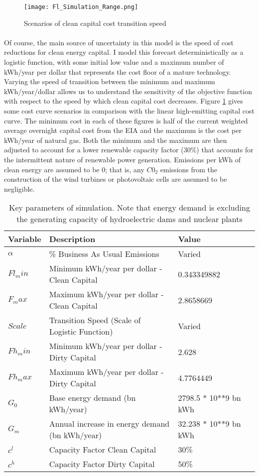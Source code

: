 \documentclass{easychithesis}
\begin{document}
\begin{figure}[h]
\texttt{[image: Fl\_Simulation\_Range.png]}
\caption{Scenarios of clean capital cost transition speed \label{fig:FlScaleScenarios}}
\end{figure}

\paragraph{} Of course, the main source of uncertainty in this model is the speed of cost reductions for clean energy capital. I model this forecast deterministically as a logistic function, with some initial low value and a maximum number of kWh/year per dollar that represents the cost floor of a mature technology. Varying the speed of transition between the minimum and maximum kWh/year/dollar allows us to understand the sensitivity of the objective function with respect to the speed by which clean capital cost decreases. Figure \ref{fig:FlScaleScenarios} gives some cost curve scenarios in comparison with the linear high-emitting capital cost curve. The minimum cost in each of these figures is half of the current weighted average overnight capital cost from the EIA and the maximum is the cost per kWh/year of natural gas. Both the minimum and the maximum are then adjusted to account for a lower renewable capacity factor (30\%) that accounts for the intermittent nature of renewable power generation. Emissions per kWh of clean energy are assumed to be 0; that is, any $C0_2$ emissions from the construction of the wind turbines or photovoltaic cells are assumed to be negligible. 


\begin{table}[h]\label{tab:ParamValues}
\begin{tabulary}{1.0\textwidth}{LLLL}
Variable & Description & Value\\
\hline
$\alpha$ &  \% Business As Usual Emissions  &  Varied \\
$Fl_min$ & Minimum kWh/year per dollar - Clean Capital & 0.343349882\\
$F_max$ & Maximum kWh/year per dollar - Clean Capital & 2.8658669 \\
$Scale$ & Transition Speed  (Scale of Logistic Function) & Varied \\
$Fh_min$ & Minimum kWh/year per dollar - Dirty Capital & 2.628 \\
$Fh_max$ & Maximum kWh/year per dollar - Dirty Capital & 4.7764449 \\
$G_0$ & Base energy demand (bn kWh/year) & 2798.5 * 10**9 bn kWh\\
$G_m$ & Annual increase in energy demand (bn kWh/year) & 32.238 * 10**9 bn kWh \\
$c^l$ & Capacity Factor Clean Capital & 30\% \\
$c^h$ & Capacity Factor Dirty Capital & 50\% \\
\hline
\end{tabulary}
\caption{Key parameters of simulation. Note that energy demand is excluding the generating capacity of hydroelectric dams and nuclear plants}
\end{table}
\end{document}

